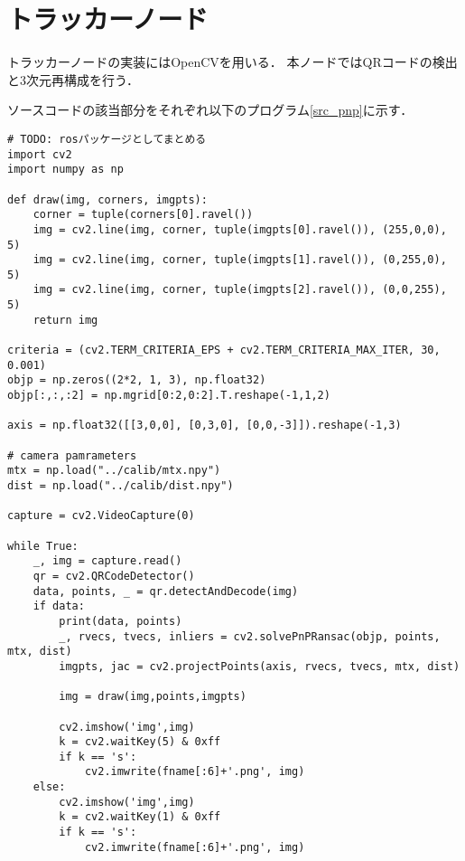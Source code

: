 \section{トラッカーノード}
\label{implement_tracker}
トラッカーノードの実装にはOpenCVを用いる．
本ノードではQRコードの検出と3次元再構成を行う．

ソースコードの該当部分をそれぞれ以下のプログラム\ref{src_pnp}に示す．

\begin{lstlisting}[caption=pnp\_qr.py,label=src_pnp]
# TODO: rosパッケージとしてまとめる
import cv2
import numpy as np

def draw(img, corners, imgpts):
    corner = tuple(corners[0].ravel())
    img = cv2.line(img, corner, tuple(imgpts[0].ravel()), (255,0,0), 5)
    img = cv2.line(img, corner, tuple(imgpts[1].ravel()), (0,255,0), 5)
    img = cv2.line(img, corner, tuple(imgpts[2].ravel()), (0,0,255), 5)
    return img

criteria = (cv2.TERM_CRITERIA_EPS + cv2.TERM_CRITERIA_MAX_ITER, 30, 0.001)
objp = np.zeros((2*2, 1, 3), np.float32)
objp[:,:,:2] = np.mgrid[0:2,0:2].T.reshape(-1,1,2)

axis = np.float32([[3,0,0], [0,3,0], [0,0,-3]]).reshape(-1,3)

# camera pamrameters
mtx = np.load("../calib/mtx.npy")
dist = np.load("../calib/dist.npy")

capture = cv2.VideoCapture(0)

while True:
    _, img = capture.read()
    qr = cv2.QRCodeDetector()
    data, points, _ = qr.detectAndDecode(img)
    if data:
        print(data, points)
        _, rvecs, tvecs, inliers = cv2.solvePnPRansac(objp, points, mtx, dist)
        imgpts, jac = cv2.projectPoints(axis, rvecs, tvecs, mtx, dist)

        img = draw(img,points,imgpts)

        cv2.imshow('img',img)
        k = cv2.waitKey(5) & 0xff
        if k == 's':
            cv2.imwrite(fname[:6]+'.png', img)
    else:
        cv2.imshow('img',img)
        k = cv2.waitKey(1) & 0xff
        if k == 's':
            cv2.imwrite(fname[:6]+'.png', img)
\end{lstlisting}
